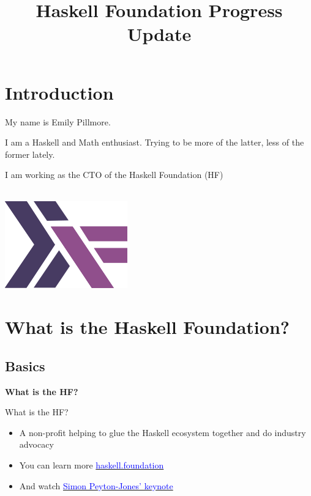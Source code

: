 \documentclass[tikz]{beamer}
\newcommand{\blue}[1]{\textcolor{blue}{#1}}
\theoremstyle{definition}
\begin{document}
\title{Haskell Foundation Progress Update}


\frame{\titlepage}

\section[Outline]{}
\frame{ \tableofcontents[hideallsubsections] }

\section{Introduction}

\frame
{
	My name is Emily Pillmore.

	I am a Haskell and Math enthusiast. Trying to be more of the latter, less of the former lately.
}

\frame
{
	I am working as the CTO of the Haskell Foundation (HF)
	\\ \\
	\begin{center}
		\includegraphics[scale=0.3]{hf.png}
	\end{center}

}

\section{What is the Haskell Foundation?}

\subsection{Basics}
\frame
{
	\textbf{What is the HF?}
	
	
}

\frame
{
	What is the HF?
	
	\begin{itemize}
		\item A non-profit helping to glue the Haskell ecosystem together and do industry advocacy
		\item You can learn more \href{https://haskell.foundation}{\blue{haskell.foundation}}
		\item And watch \href{https://www.youtube.com/watch?v=MEmRarBL9kw}{\blue{Simon Peyton-Jones' keynote}}
	\end{itemize}
}
\end{document}
